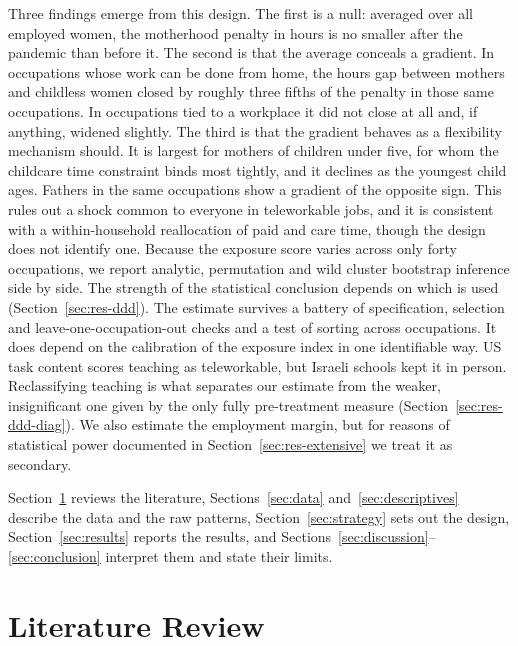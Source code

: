 \documentclass[12pt,a4paper]{article}
\begin{document}
\noindent Three findings emerge from this design. The first is a null: averaged over all employed women, the
motherhood penalty in hours is no smaller after the pandemic than before it. The second is that
the average conceals a gradient. In occupations whose work can be done from home, the hours gap
between mothers and childless women closed by roughly three fifths of the penalty in those same
occupations. In occupations tied to a workplace it did not close at all and, if anything,
widened slightly. The third is that the gradient behaves as a flexibility mechanism should. It is
largest for mothers of children under five, for whom the childcare time constraint binds most
tightly, and it declines as the youngest child ages. Fathers in the same occupations show a
gradient of the opposite sign. This rules out a shock common to everyone in teleworkable jobs, and
it is consistent with a within-household reallocation of paid and care time, though the design does
not identify one. Because the exposure score varies across only forty occupations, we report analytic,
permutation and wild cluster bootstrap inference side by side. The strength of the statistical
conclusion depends on which is used (Section~\ref{sec:res-ddd}). The estimate survives a battery of
specification, selection and leave-one-occupation-out checks and a test of sorting across
occupations. It does depend on the calibration of the exposure index in one identifiable way. US task
content scores teaching as teleworkable, but Israeli schools kept it in person. Reclassifying
teaching is what separates our estimate from the weaker, insignificant one given by the only fully
pre-treatment measure (Section~\ref{sec:res-ddd-diag}). We also estimate the employment margin, but for reasons of
statistical power documented in Section~\ref{sec:res-extensive} we treat it as secondary.

\noindent Section~\ref{sec:lit} reviews the literature, Sections~\ref{sec:data} and~\ref{sec:descriptives}
describe the data and the raw patterns, Section~\ref{sec:strategy} sets out the design,
Section~\ref{sec:results} reports the results, and Sections~\ref{sec:discussion}--\ref{sec:conclusion}
interpret them and state their limits.

\section{Literature Review}\label{sec:lit}
\end{document}

